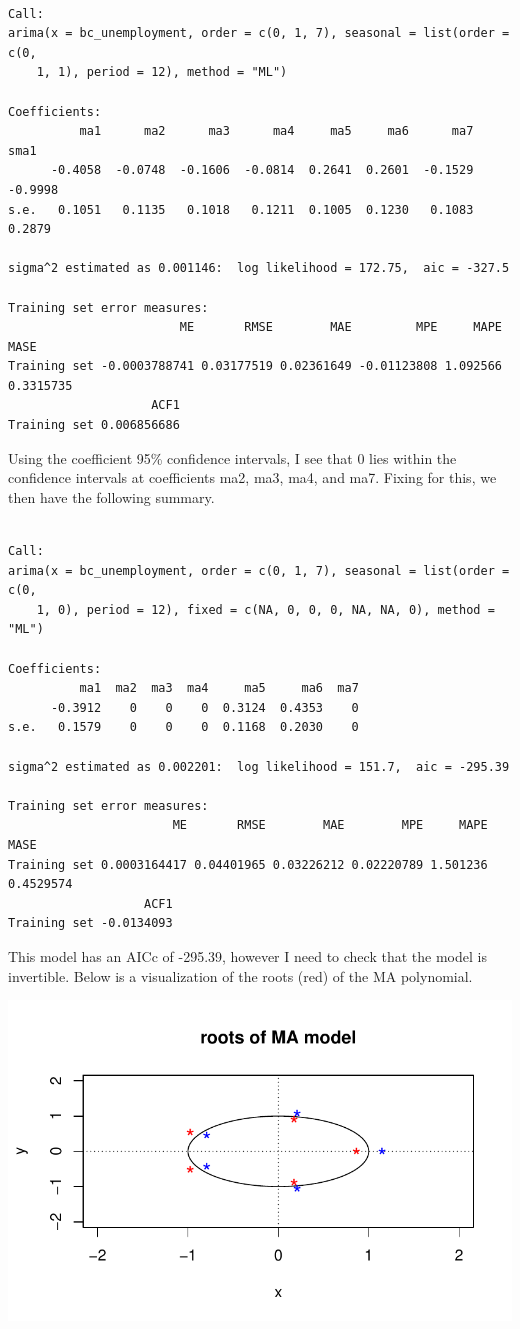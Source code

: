 \documentclass[
  letterpaper,
  DIV=11,
  numbers=noendperiod]{scrartcl}
\begin{document}
\begin{verbatim}

Call:
arima(x = bc_unemployment, order = c(0, 1, 7), seasonal = list(order = c(0, 
    1, 1), period = 12), method = "ML")

Coefficients:
          ma1      ma2      ma3      ma4     ma5     ma6      ma7     sma1
      -0.4058  -0.0748  -0.1606  -0.0814  0.2641  0.2601  -0.1529  -0.9998
s.e.   0.1051   0.1135   0.1018   0.1211  0.1005  0.1230   0.1083   0.2879

sigma^2 estimated as 0.001146:  log likelihood = 172.75,  aic = -327.5

Training set error measures:
                        ME       RMSE        MAE         MPE     MAPE      MASE
Training set -0.0003788741 0.03177519 0.02361649 -0.01123808 1.092566 0.3315735
                    ACF1
Training set 0.006856686
\end{verbatim}

Using the coefficient 95\% confidence intervals, I see that 0 lies
within the confidence intervals at coefficients ma2, ma3, ma4, and ma7.
Fixing for this, we then have the following summary.

\begin{verbatim}

Call:
arima(x = bc_unemployment, order = c(0, 1, 7), seasonal = list(order = c(0, 
    1, 0), period = 12), fixed = c(NA, 0, 0, 0, NA, NA, 0), method = "ML")

Coefficients:
          ma1  ma2  ma3  ma4     ma5     ma6  ma7
      -0.3912    0    0    0  0.3124  0.4353    0
s.e.   0.1579    0    0    0  0.1168  0.2030    0

sigma^2 estimated as 0.002201:  log likelihood = 151.7,  aic = -295.39

Training set error measures:
                       ME       RMSE        MAE        MPE     MAPE      MASE
Training set 0.0003164417 0.04401965 0.03226212 0.02220789 1.501236 0.4529574
                   ACF1
Training set -0.0134093
\end{verbatim}

This model has an AICc of -295.39, however I need to check that the
model is invertible. Below is a visualization of the roots (red) of the
MA polynomial.

\includegraphics{Final_Project_files/figure-pdf/unnamed-chunk-20-1.pdf}
\end{document}
